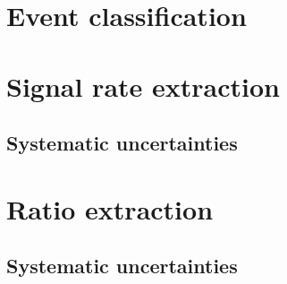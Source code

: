\section{Event classification}
\section{Signal rate extraction}
\subsection{Systematic uncertainties}
\section{Ratio extraction}
\subsection{Systematic uncertainties}
